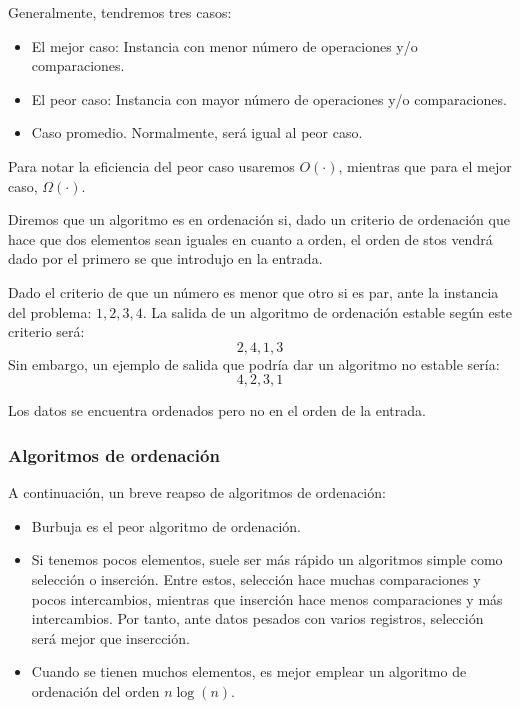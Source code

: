 Generalmente, tendremos tres casos:
\begin{itemize}
    \item El mejor caso: Instancia con menor número de operaciones y/o comparaciones.
    \item El peor caso: Instancia con mayor número de operaciones y/o comparaciones.
    \item Caso promedio. Normalmente, será igual al peor caso.
\end{itemize}
Para notar la eficiencia del peor caso usaremos $O(\cdot)$, mientras que para el mejor caso, $\Omega(\cdot)$.

Diremos que un algoritmo es  en ordenación si, dado un criterio de ordenación que hace que dos elementos sean iguales en cuanto a orden, el orden de stos vendrá dado por el primero se que introdujo en la entrada. 
\begin{ejemplo}
    Dado el criterio de que un número es menor que otro si es par, ante la instancia del problema: $1, 2, 3, 4$. La salida de un algoritmo de ordenación estable según este criterio será:
\[
2, 4, 1, 3
\]
Sin embargo, un ejemplo de salida que podría dar un algoritmo no estable sería:
\[
4, 2, 3, 1
\]

Los datos se encuentra ordenados pero no en el orden de la entrada.
\end{ejemplo}

\subsubsection{Algoritmos de ordenación}
A continuación, un breve reapso de algoritmos de ordenación:

\begin{itemize}
    \item Burbuja es el peor algoritmo de ordenación.
    \item Si tenemos pocos elementos, suele ser más rápido un algoritmos simple como selección o inserción. Entre estos, selección hace muchas comparaciones y pocos intercambios, mientras que inserción hace menos comparaciones y más intercambios. Por tanto, ante datos pesados con varios registros, selección será mejor que insercción.
    \item Cuando se tienen muchos elementos, es mejor emplear un algoritmo de ordenación del orden $n\log(n)$.
\end{itemize}


